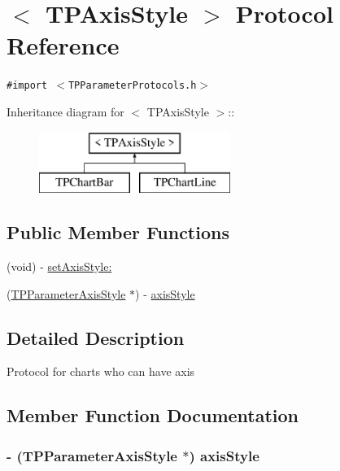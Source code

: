 \hypertarget{protocol_t_p_axis_style-p}{
\section{$<$ TPAxisStyle $>$ Protocol Reference}
\label{protocol_t_p_axis_style-p}
}
{\tt \#import $<$TPParameterProtocols.h$>$}

Inheritance diagram for $<$ TPAxisStyle $>$::\begin{figure}[H]
\begin{center}
\leavevmode
\includegraphics[height=2cm]{protocol_t_p_axis_style-p}
\end{center}
\end{figure}
\subsection*{Public Member Functions}
\begin{CompactItemize}
\item 
(void) - \hyperlink{protocol_t_p_axis_style-p_2e524aea66679aa46e6456b64c9327ec}{setAxisStyle:}
\item 
(\hyperlink{interface_t_p_parameter_axis_style}{TPParameterAxisStyle} $\ast$) - \hyperlink{protocol_t_p_axis_style-p_9a7d824177e264c439184e87ae6918fa}{axisStyle}
\end{CompactItemize}


\subsection{Detailed Description}
Protocol for charts who can have axis 

\subsection{Member Function Documentation}
\hypertarget{protocol_t_p_axis_style-p_9a7d824177e264c439184e87ae6918fa}{
\subsubsection[{axisStyle}]{\setlength{\rightskip}{0pt plus 5cm}- ({\bf TPParameterAxisStyle} $\ast$) axisStyle }}
\label{protocol_t_p_axis_style-p_9a7d824177e264c439184e87ae6918fa}


